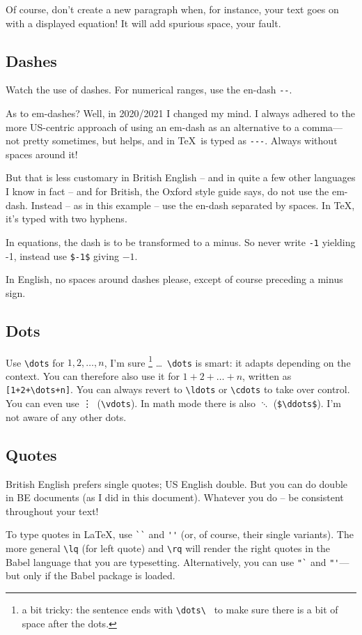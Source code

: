 \documentclass{article}
\begin{document}
Of course, don't create a new paragraph when, for instance, your text goes on with a displayed equation!  It will add spurious space, your fault.


\subsection{Dashes}
Watch the use of dashes.  For numerical ranges, use the en-dash \verb+--+.

As to em-dashes?  Well, in 2020/2021 I changed my mind.  I always adhered to the more US-centric approach of using an em-dash as an alternative to a comma---not pretty sometimes, but helps, and in \TeX\ is typed as \verb+---+.  Always without spaces around it! 

But that is less customary in British English -- and in quite a few other languages I know in fact -- and for British, the Oxford style guide says, do not use the em-dash. Instead -- as in this example -- use the en-dash separated by spaces.  In \TeX, it's typed with two hyphens.

In equations, the dash is to be transformed to a minus.  So never write \verb+-1+ yielding -1, instead use \verb+$-1$+ giving $-1$.

In English, no spaces around dashes please, except of course preceding a minus sign.

\subsection{Dots}
Use \verb+\dots+ for $1,2,\dots,n$, I'm sure%
\footnote{a bit tricky: the sentence ends with \protect\verb+\dots\ + to make sure
there is a bit of space after the dots.}%
\dots\ \verb+\dots+ is smart: it adapts depending on the context.  You can therefore also use it for $1+2+\dots+n$, written as \verb-[1+2+\dots+n]-. You can always revert to \verb+\ldots+ or \verb+\cdots+ to take over control.  You can even use \vdots\ (\verb+\vdots+).  In math mode there is also $\ddots$ (\verb+$\ddots$+).  I'm not aware of any other dots.

\subsection{Quotes}
British English prefers single quotes; US English double.  But you can do double in BE documents (as I did in this document).  Whatever you do -- be consistent throughout your text!

To type quotes in \LaTeX, use \verb+``+ and \verb+''+ (or, of course, their single variants).  The more general \verb+\lq+ (for left quote) and \verb+\rq+ will render the right quotes in the Babel language that you are typesetting.  Alternatively, you can use \verb+"`+ and \verb+"'+---but only if the Babel package is loaded.
\end{document}
